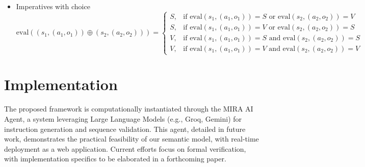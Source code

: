 \documentclass[a4paper,11pt]{lmcs}
\begin{document}
\begin{itemize}
\item Imperatives with choice
\[
\text{eval}((s_1, (a_1, o_1)) \oplus (s_2, (a_2, o_2))) =
\begin{cases}
S, & \text{if } \text{eval}(s_1, (a_1, o_1)) = S
  \text{ or } \text{eval}(s_2, (a_2, o_2)) = V  \\[1.5ex]
S, & \text{if } \text{eval}(s_1, (a_1, o_1)) = V
  \text{ or } \text{eval}(s_2, (a_2, o_2)) = S  \\[1.5ex]
V, & \text{if } \text{eval}(s_1, (a_1, o_1)) = S
  \text{ and } \text{eval}(s_2, (a_2, o_2)) = S \\[1.5ex]
V, & \text{if } \text{eval}(s_1, (a_1, o_1)) = V
  \text{ and } \text{eval}(s_2, (a_2, o_2)) = V
\end{cases}
\]


\end{itemize}






\section{Implementation}
The proposed framework is computationally instantiated through the MIRA AI Agent, a system leveraging Large Language Models (e.g., Groq, Gemini) for instruction generation and sequence validation. This agent, detailed in future work, demonstrates the practical feasibility of our semantic model, with real-time deployment as a web application. Current efforts focus on formal verification, with implementation specifics to be elaborated in a forthcoming paper.
\end{document}
